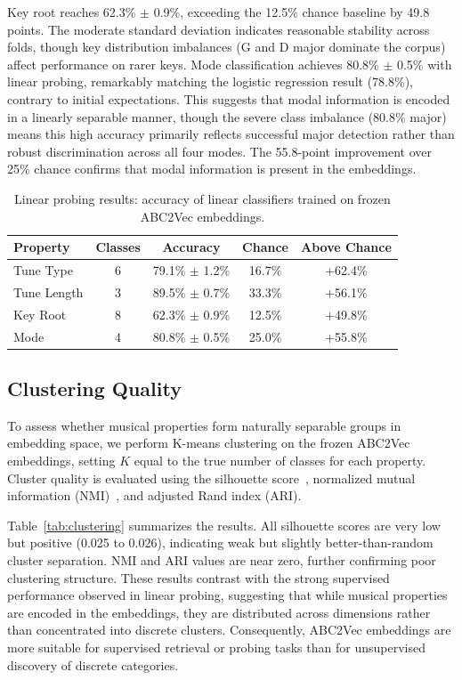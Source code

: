 \documentclass[]{interact}
\theoremstyle{plain}
\theoremstyle{definition}
\theoremstyle{remark}
\begin{document}
Key root reaches 62.3\% $\pm$ 0.9\%, exceeding the 12.5\% chance baseline by 49.8 points. The moderate standard deviation indicates reasonable stability across folds, though key distribution imbalances (G and D major dominate the corpus) affect performance on rarer keys. Mode classification achieves 80.8\% $\pm$ 0.5\% with linear probing, remarkably matching the logistic regression result (78.8\%), contrary to initial expectations. This suggests that modal information is encoded in a linearly separable manner, though the severe class imbalance (80.8\% major) means this high accuracy primarily reflects successful major detection rather than robust discrimination across all four modes. The 55.8-point improvement over 25\% chance confirms that modal information is present in the embeddings.

\begin{table}[!htb]
\centering
\caption{Linear probing results: accuracy of linear classifiers trained on frozen ABC2Vec embeddings.}
\label{tab:probing}
\begin{tabular}{lcccc}
\toprule
\textbf{Property} & \textbf{Classes} & \textbf{Accuracy} & \textbf{Chance} & \textbf{Above Chance} \\
\midrule
Tune Type & 6 & 79.1\% $\pm$ 1.2\% & 16.7\% & +62.4\% \\
Tune Length & 3 & 89.5\% $\pm$ 0.7\% & 33.3\% & +56.1\% \\
Key Root & 8 & 62.3\% $\pm$ 0.9\% & 12.5\% & +49.8\% \\
Mode & 4 & 80.8\% $\pm$ 0.5\% & 25.0\% & +55.8\% \\
\bottomrule
\end{tabular}
\end{table}


\subsection{Clustering Quality}

To assess whether musical properties form naturally separable groups in embedding space, we perform K-means clustering on the frozen ABC2Vec embeddings, setting $K$ equal to the true number of classes for each property. Cluster quality is evaluated using the silhouette score~\cite{SilhouetteScore1987}, normalized mutual information (NMI)~\cite{NMI2002}, and adjusted Rand index (ARI).

Table~\ref{tab:clustering} summarizes the results. All silhouette scores are very low but positive (0.025 to 0.026), indicating weak but slightly better-than-random cluster separation. NMI and ARI values are near zero, further confirming poor clustering structure. These results contrast with the strong supervised performance observed in linear probing, suggesting that while musical properties are encoded in the embeddings, they are distributed across dimensions rather than concentrated into discrete clusters. Consequently, ABC2Vec embeddings are more suitable for supervised retrieval or probing tasks than for unsupervised discovery of discrete categories.
\end{document}
